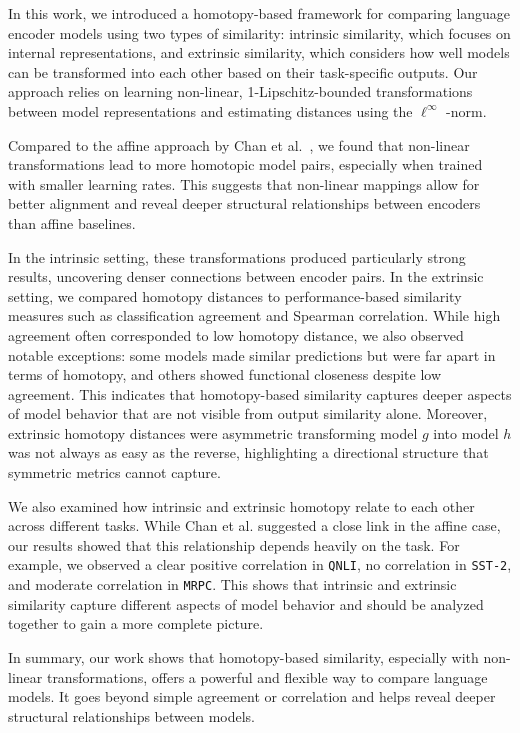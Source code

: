 In this work, we introduced a homotopy-based framework for comparing language encoder models using two types of similarity: intrinsic similarity, which focuses on internal representations, and extrinsic similarity, which considers how well models can be transformed into each other based on their task-specific outputs.
Our approach relies on learning non-linear, 1-Lipschitz-bounded transformations between model representations and estimating distances using the \(\ell^\infty\) -norm.

Compared to the affine approach by Chan et al.~\cite{chan_affine_2024}, we found that non-linear transformations lead to more homotopic model pairs, especially when trained with smaller learning rates.
This suggests that non-linear mappings allow for better alignment and reveal deeper structural relationships between encoders than affine baselines.

In the intrinsic setting, these transformations produced particularly strong results, uncovering denser connections between encoder pairs. 
In the extrinsic setting, we compared homotopy distances to performance-based similarity measures such as classification agreement and Spearman correlation. 
While high agreement often corresponded to low homotopy distance, we also observed notable exceptions: some models made similar predictions but were far apart in terms of homotopy, and others showed functional closeness despite low agreement.
This indicates that homotopy-based similarity captures deeper aspects of model behavior that are not visible from output similarity alone. 
Moreover, extrinsic homotopy distances were asymmetric transforming model \( g \) into model \( h \) was not always as easy as the reverse, highlighting a directional structure that symmetric metrics cannot capture.

We also examined how intrinsic and extrinsic homotopy relate to each other across different tasks.
While Chan et al. \cite{chan_affine_2024} suggested a close link in the affine case, our results showed that this relationship depends heavily on the task.
For example, we observed a clear positive correlation in \texttt{QNLI}, no correlation in \texttt{SST-2}, and moderate correlation in \texttt{MRPC}.
This shows that intrinsic and extrinsic similarity capture different aspects of model behavior and should be analyzed together to gain a more complete picture.

In summary, our work shows that homotopy-based similarity, especially with non-linear transformations, offers a powerful and flexible way to compare language models. 
It goes beyond simple agreement or correlation and helps reveal deeper structural relationships between models.


